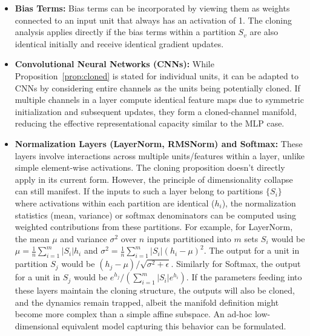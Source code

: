 \documentclass{article}
\begin{document}
\begin{itemize}
    \item \textbf{Bias Terms:} Bias terms can be incorporated by viewing them as weights connected to an input unit that always has an activation of 1. The cloning analysis applies directly if the bias terms within a partition $S_v$ are also identical initially and receive identical gradient updates.
    \item \textbf{Convolutional Neural Networks (CNNs):} While Proposition~\ref{prop:cloned} is stated for individual units, it can be adapted to CNNs by considering entire channels as the units being potentially cloned. If multiple channels in a layer compute identical feature maps due to symmetric initialization and subsequent updates, they form a cloned-channel manifold, reducing the effective representational capacity similar to the MLP case.
    \item \textbf{Normalization Layers (LayerNorm, RMSNorm) and Softmax:} These layers involve interactions across multiple units/features within a layer, unlike simple element-wise activations. The cloning proposition doesn't directly apply in its current form. However, the principle of dimensionality collapse can still manifest. If the inputs to such a layer belong to partitions $\{S_i\}$ where activations within each partition are identical ($h_i$), the normalization statistics (mean, variance) or softmax denominators can be computed using weighted contributions from these partitions. For example, for LayerNorm, the mean $\mu$ and variance $\sigma^2$ over $n$ inputs partitioned into $m$ sets $S_i$ would be $\mu = \frac{1}{n}\sum_{i=1}^m |S_i| h_i$ and $\sigma^2 = \frac{1}{n}\sum_{i=1}^m |S_i| (h_i - \mu)^2$. The output for a unit in partition $S_j$ would be $(h_j - \mu) / \sqrt{\sigma^2 + \epsilon}$. Similarly for Softmax, the output for a unit in $S_j$ would be $e^{h_j} / (\sum_{i=1}^m |S_i| e^{h_i})$. If the parameters feeding into these layers maintain the cloning structure, the outputs will also be cloned, and the dynamics remain trapped, albeit the manifold definition might become more complex than a simple affine subspace. An ad-hoc low-dimensional equivalent model capturing this behavior can be formulated.
\end{itemize}
\end{document}
